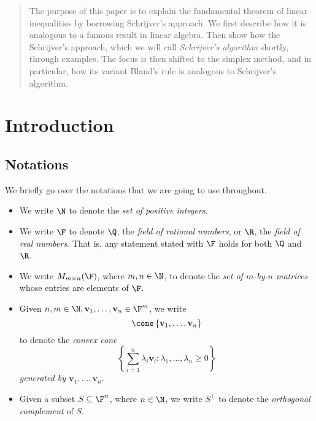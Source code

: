 \documentclass{article}
\renewcommand{\vec}{\mathbf}
\begin{document}


\begin{abstract}
    The purpose of this paper is to explain the fundamental theorem of linear inequalities by borrowing Schrijver's approach. We first describe how it is analogous to a famous result in linear algebra. Then show how the Schrijver's approach, which we will call \textit{Schrijver's algorithm} shortly, through examples. The focus is then shifted to the simplex method, and in particular, how its variant Bland's rule is analogous to Schrijver's algorithm. 
\end{abstract}

\section{Introduction}

\subsection{Notations}

We briefly go over the notations that we are going to use throughout.
\begin{itemize}
    \item We write $\N$ to denote the \textit{set of positive integers}.
    \item We write $\F$ to denote $\Q$, the \textit{field of rational numbers}, or $\R$, the \textit{field of real numbers}. That is, any statement stated with $\F$ holds for both $\Q$ and $\R$.
    \item We write $M_{m\times n}(\F)$, where $m,n\in\N$, to denote the \textit{set of $m$-by-$n$ matrices} whose entries are elements of $\F$.
    \item Given $n,m\in\N, \vec{v}_1,\ldots,\vec{v}_n\in\F^m$, we write
        \begin{equation*}
            \cone\left\lbrace \vec{v}_1,\ldots,\vec{v}_n \right\rbrace
        \end{equation*}
        to denote the \textit{convex cone} 
        \begin{equation*}
            \left\lbrace \sum^{n}_{i=1} \lambda_i\vec{v}_i: \lambda_1,\ldots,\lambda_n\geq 0 \right\rbrace
        \end{equation*}
        \textit{generated by $\vec{v}_1,\ldots,\vec{v}_n$}.
    \item Given a subset $S\subseteq\F^n$, where $n\in\N$, we write $S^{\perp}$ to denote the \textit{orthogonal complement} of $S$.
\end{itemize} 
\end{document}
